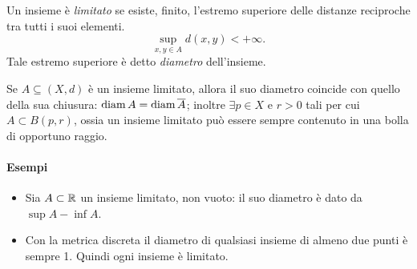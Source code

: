 \begin{definizione}
Un insieme è \emph{limitato} se esiste, finito, l'estremo superiore delle distanze reciproche tra tutti i suoi elementi.
\[
\sup_{x,y\in A} d(x,y)<+\infty.
\]
Tale estremo superiore è detto \emph{diametro} dell'insieme.
\end{definizione}
Se $A\subseteq (X,d)$ è un insieme limitato, allora il suo diametro coincide con quello della sua chiusura: $\operatorname{diam} A=\operatorname{diam}\overline{A}$; inoltre $\exists p\in X$ e $r>0$ tali per cui $A\subset B(p,r)$, ossia un insieme limitato può essere sempre contenuto in una bolla di opportuno raggio.
\paragraph{Esempi}
\begin{itemize}
\item Sia $A\subset\mathbb{R}$ un insieme limitato, non vuoto: il suo diametro è dato da $\sup A-\inf A$.
\item Con la metrica discreta il diametro di qualsiasi insieme di almeno due punti è sempre 1. Quindi ogni insieme è limitato.
\end{itemize}
